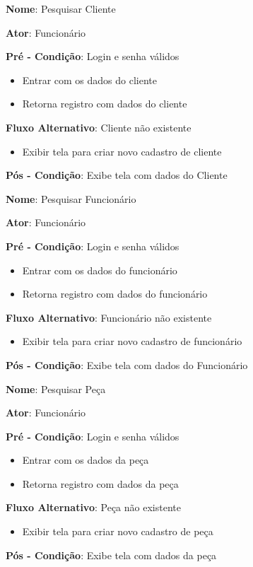 \documentclass[a4paper,10pt]{article}
\begin{document}
\begin{framed}
\textbf{Nome}: Pesquisar Cliente

\textbf{Ator}: Funcionário

\textbf{Pré - Condição}: Login e senha válidos
\begin{itemize}
\item Entrar com os dados do cliente 
\item Retorna registro com dados do cliente
\end{itemize}
\textbf{Fluxo Alternativo}: Cliente não existente
\begin{itemize}
\item Exibir tela para criar novo cadastro de cliente
\end{itemize}
\textbf{Pós - Condição}: Exibe tela com dados do Cliente 
\end{framed}

\begin{framed}
\textbf{Nome}: Pesquisar Funcionário

\textbf{Ator}: Funcionário

\textbf{Pré - Condição}: Login e senha válidos
\begin{itemize}
\item Entrar com os dados do funcionário
\item Retorna registro com dados do funcionário
\end{itemize}
\textbf{Fluxo Alternativo}: Funcionário não existente
\begin{itemize}
\item Exibir tela para criar novo cadastro de funcionário
\end{itemize}
\textbf{Pós - Condição}: Exibe tela com dados do Funcionário
\end{framed}

\begin{framed}
\textbf{Nome}: Pesquisar Peça

\textbf{Ator}: Funcionário

\textbf{Pré - Condição}: Login e senha válidos
\begin{itemize}
\item Entrar com os dados da peça
\item Retorna registro com dados da peça
\end{itemize}
\textbf{Fluxo Alternativo}: Peça não existente
\begin{itemize}
\item Exibir tela para criar novo cadastro de peça
\end{itemize}
\textbf{Pós - Condição}: Exibe tela com dados da peça
\end{framed}
\end{document}
